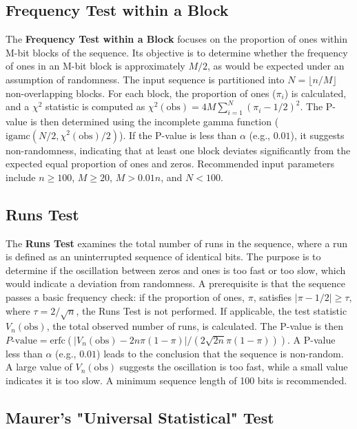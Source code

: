\subsection{\textbf{Frequency Test within a Block}}

The \textbf{Frequency Test within a Block} focuses on the proportion of ones within M-bit blocks of the sequence. Its objective is to determine whether the frequency of ones in an M-bit block is approximately $M/2$, as would be expected under an assumption of randomness. The input sequence is partitioned into $N = \lfloor n/M \rfloor$ non-overlapping blocks. For each block, the proportion of ones ($\pi_i$) is calculated, and a $\chi^2$ statistic is computed as $\chi^2(\text{obs}) = 4M \sum_{i=1}^{N}(\pi_i - 1/2)^2$. The P-value is then determined using the incomplete gamma function ($\text{igamc}(N/2, \chi^2(\text{obs})/2)$). If the P-value is less than $\alpha$ (e.g., $0.01$), it suggests non-randomness, indicating that at least one block deviates significantly from the expected equal proportion of ones and zeros. Recommended input parameters include $n \ge 100$, $M \ge 20$, $M > 0.01n$, and $N < 100$.



\subsection{\textbf{Runs Test}}

The \textbf{Runs Test} examines the total number of runs in the sequence, where a run is defined as an uninterrupted sequence of identical bits. The purpose is to determine if the oscillation between zeros and ones is too fast or too slow, which would indicate a deviation from randomness. A prerequisite is that the sequence passes a basic frequency check: if the proportion of ones, $\pi$, satisfies $|\pi - 1/2| \ge \tau$, where $\tau = 2/\sqrt{n}$, the Runs Test is not performed. If applicable, the test statistic $V_n(\text{obs})$, the total observed number of runs, is calculated. The P-value is then $P\text{-value} = \text{erfc}(|V_n(\text{obs}) - 2n\pi(1-\pi)| / (2\sqrt{2n}\pi(1-\pi)))$. A P-value less than $\alpha$ (e.g., $0.01$) leads to the conclusion that the sequence is non-random. A large value of $V_n(\text{obs})$ suggests the oscillation is too fast, while a small value indicates it is too slow. A minimum sequence length of 100 bits is recommended.



\subsection{\textbf{Maurer's "Universal Statistical" Test}}

